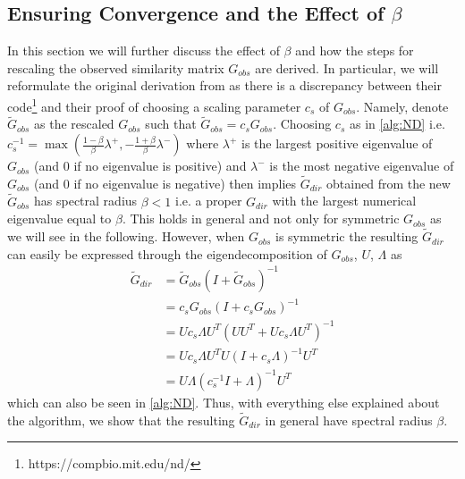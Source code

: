 \documentclass[../Thesis.tex]{subfiles}
\begin{document}
\subsection{Ensuring Convergence and the Effect of \texorpdfstring{$\beta$}{beta}}
In this section we will further discuss the effect of $\beta$ and how the steps for rescaling the observed similarity matrix $G_{obs}$ are derived. In particular, we will reformulate the original derivation from \cite{Network-deconvolution-as-a-general-method-to-distinguish-direct-dependencies-in-networks} as there is a discrepancy between their code\footnote{https://compbio.mit.edu/nd/} and their proof of choosing a scaling parameter $c_s$ of $G_{obs}$. Namely, denote $\tilde{G}_{obs}$ as the rescaled $G_{obs}$ such that $\tilde{G}_{obs} = c_s G_{obs}$. Choosing $c_s$ as in \autoref{alg:ND} i.e. $c_s^{-1} = \max \left( \frac{1-\beta}{\beta} \lambda^+,  -\frac{1+\beta}{\beta} \lambda^- \right)$ where $\lambda^+$ is the largest positive eigenvalue of $G_{obs}$ (and $0$ if no eigenvalue is positive) and $\lambda^-$ is the most negative eigenvalue of $G_{obs}$ (and $0$ if no eigenvalue is negative) then implies $\tilde{G}_{dir}$ obtained from the new $\tilde{G}_{obs}$ has spectral radius $\beta < 1$ i.e. a proper $G_{dir}$ with the largest numerical eigenvalue equal to $\beta$. This holds in general and not only for symmetric $G_{obs}$ as we will see in the following. However, when $G_{obs}$ is symmetric the resulting $\tilde{G}_{dir}$ can easily be expressed through the eigendecomposition of $G_{obs}$, $U$, $\Lambda$ as
\begin{align*}
    \tilde{G}_{dir} & = \tilde{G}_{obs} \left( I + \tilde{G}_{obs}\right)^{-1}         \\
                    & = c_s G_{obs} \left( I + c_s G_{obs}\right)^{-1}                 \\
                    & = U c_s \Lambda U^T \left( U U^T + U c_s \Lambda U^T\right)^{-1} \\
                    & = U c_s \Lambda U^T U \left( I + c_s \Lambda\right)^{-1} U^T     \\
                    & = U \Lambda \left(c_s^{-1} I + \Lambda\right)^{-1}U^T
\end{align*}
which can also be seen in \autoref{alg:ND}. Thus, with everything else explained about the algorithm, we show that the resulting $\tilde{G}_{dir}$ in general have spectral radius $\beta$.
\end{document}
